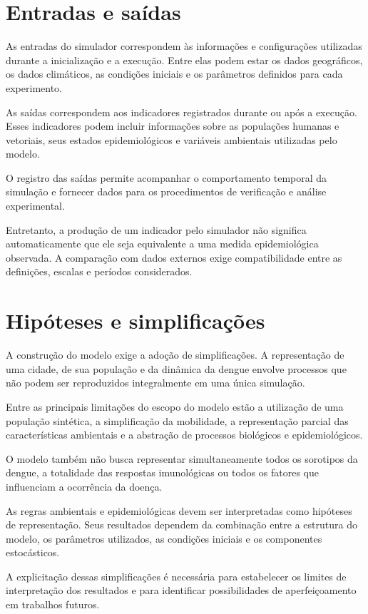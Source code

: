 \section{Entradas e saídas}

As entradas do simulador correspondem às informações e configurações utilizadas durante a inicialização e a execução. Entre elas podem estar os dados geográficos, os dados climáticos, as condições iniciais e os parâmetros definidos para cada experimento.

As saídas correspondem aos indicadores registrados durante ou após a execução. Esses indicadores podem incluir informações sobre as populações humanas e vetoriais, seus estados epidemiológicos e variáveis ambientais utilizadas pelo modelo.

O registro das saídas permite acompanhar o comportamento temporal da simulação e fornecer dados para os procedimentos de verificação e análise experimental.

Entretanto, a produção de um indicador pelo simulador não significa automaticamente que ele seja equivalente a uma medida epidemiológica observada. A comparação com dados externos exige compatibilidade entre as definições, escalas e períodos considerados.

\section{Hipóteses e simplificações}

A construção do modelo exige a adoção de simplificações. A representação de uma cidade, de sua população e da dinâmica da dengue envolve processos que não podem ser reproduzidos integralmente em uma única simulação.

Entre as principais limitações do escopo do modelo estão a utilização de uma população sintética, a simplificação da mobilidade, a representação parcial das características ambientais e a abstração de processos biológicos e epidemiológicos.

O modelo também não busca representar simultaneamente todos os sorotipos da dengue, a totalidade das respostas imunológicas ou todos os fatores que influenciam a ocorrência da doença.

As regras ambientais e epidemiológicas devem ser interpretadas como hipóteses de representação. Seus resultados dependem da combinação entre a estrutura do modelo, os parâmetros utilizados, as condições iniciais e os componentes estocásticos.

A explicitação dessas simplificações é necessária para estabelecer os limites de interpretação dos resultados e para identificar possibilidades de aperfeiçoamento em trabalhos futuros.
